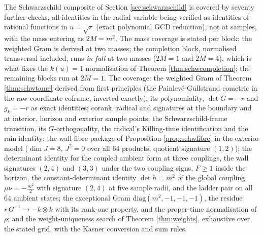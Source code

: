 \documentclass[11pt]{article}
\theoremstyle{definition}
\begin{document}
The Schwarzschild composite of Section \ref{sec:schwarzschild} is covered by seventy further checks, all identities in the radial variable being verified as identities of rational functions in $u = \sqrt r$ (exact polynomial GCD reduction), not at samples, with the mass entering as $2M = m^2$. The mass coverage is stated per block: the weighted Gram is derived at two masses; the completion block, normalised transversal included, runs \emph{in full} at two masses ($2M = 1$ and $2M = 4$), which is what fixes the $k(u) = 1$ normalisation of Theorem \ref{thm:schwcompletion}; the remaining blocks run at $2M = 1$. The coverage: the weighted Gram of Theorem \ref{thm:schwtame} derived from first principles (the Painlev\'e-Gullstrand cometric in the raw coordinate coframe, inverted exactly), its polynomiality, $\det G = -r$ and $g_k = -r$ as exact identities; corank, radical and signatures at the boundary and at interior, horizon and exterior sample points; the Schwarzschild-frame transition, its $G$-orthogonality, the radical's Killing-time identification and the rain identity; the wall-fibre package of Proposition \ref{prop:schwfibre} in the exterior model ($\dim J = 8$, $J^2 = 0$ over all $64$ products, quotient signature $(1,2)$); the determinant identity for the coupled ambient form at three couplings, the wall signatures $(2,4)$ and $(3,3)$ under the two coupling signs, $F \geq 1$ inside the horizon, the constant-determinant identity $\det h = m^2$ of the global coupling $\mu\nu = -\tfrac{m^2}{2}$ with signature $(2,4)$ at five sample radii, and the ladder pair on all $64$ ambient states; the exceptional Gram $\mathrm{diag}(m^2,-1,-1,-1)$, the residue $r\,G^{-1} \to -k \otimes k$ with its rank-one property, and the proper-time normalisation of $\rho$; and the weight-uniqueness search of Theorem \ref{thm:weights}, exhaustive over the stated grid, with the Kasner conversion and sum rules.
\end{document}
